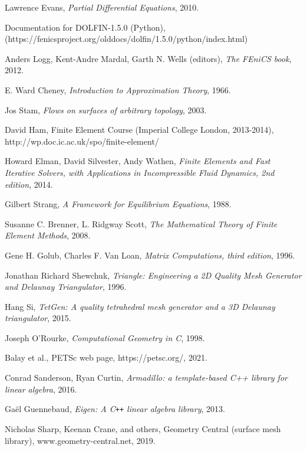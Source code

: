 \documentclass[11pt,a4paper]{memoir}
\begin{document}
\begin{thebibliography}{9}
Lawrence Evans,
\textit{Partial Differential Equations},
2010.

Documentation for DOLFIN-1.5.0 (Python),\\
(https://fenicsproject.org/olddocs/dolfin/1.5.0/python/index.html)

Anders Logg, Kent-Andre Mardal, Garth N. Wells (editors),
\textit{The FEniCS book},
2012.

E. Ward Cheney,
\textit{Introduction to Approximation Theory},
1966.

Jos Stam,
\textit{Flows on surfaces of arbitrary topology},
2003.

David Ham, Finite Element Course
(Imperial College London, 2013-2014),\\
http://wp.doc.ic.ac.uk/spo/finite-element/

Howard Elman, David Silvester, Andy Wathen,
\textit{Finite Elements and Fast Iterative Solvers, with Applications in Incompressible Fluid Dynamics, 2nd edition},
2014.

Gilbert Strang,
\textit{A Framework for Equilibrium Equations},
1988.

Susanne C. Brenner, L. Ridgway Scott,
\textit{The Mathematical Theory of Finite Element Methods},
2008.

Gene H. Golub, Charles F. Van Loan,
\textit{Matrix Computations, third edition},
1996.

Jonathan Richard Shewchuk,
\textit{Triangle: Engineering a 2D Quality Mesh Generator and Delaunay Triangulator},
1996.

Hang Si,
\textit{TetGen: A quality tetrahedral mesh generator and a 3D Delaunay triangulator},
2015.

Joseph O'Rourke,
\textit{Computational Geometry in C},
1998.

Balay et al.,
PETSc web page, https://petsc.org/,
2021.

Conrad Sanderson, Ryan Curtin,
\textit{Armadillo: a template-based C++ library for linear algebra},
2016.

Ga\"el Guennebaud,
\textit{Eigen: A C\texttt{++} linear algebra library},
2013.

Nicholas Sharp, Keenan Crane, and others,
Geometry Central (surface mesh library), www.geometry-central.net,
2019.


\end{thebibliography}
\end{document}
